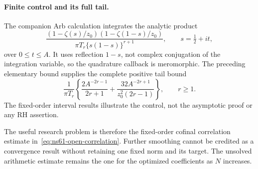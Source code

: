 \paragraph{Finite control and its full tail.}
The companion Arb calculation integrates the analytic product
\[
 \frac{(1-\zeta(s)/z_0)(1-\zeta(1-s)/z_0)}
             {\pi T_r\{s(1-s)\}^{r+1}},\qquad s=\tfrac12+it,
\]
over $0\leq t\leq A$. It uses reflection $1-s$, not complex
conjugation of the integration variable, so the quadrature callback
is meromorphic. The preceding elementary bound supplies the complete
positive tail bound
\begin{equation}
 \frac1{\pi T_r}\left\{
       \frac{2A^{-2r-1}}{2r+1}
       +\frac{32A^{-2r+1}}{z_0^2(2r-1)}\right\},\qquad r\geq1.
 \label{eq:ns63-quadrature-tail}
\end{equation}
The fixed-order interval results illustrate the control, not the
asymptotic proof or any RH assertion.

The useful research problem is therefore the fixed-order cofinal
correlation estimate in~\eqref{eq:ns61-open-correlation}. Further
smoothing cannot be credited as a convergence result without retaining
one fixed norm and its target. The unsolved arithmetic estimate remains
the one for the optimized coefficients as $N$ increases.

